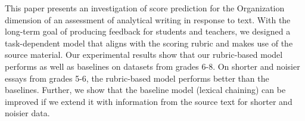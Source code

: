 This paper presents an investigation of score prediction for the Organization dimension of an assessment of analytical writing in response to text. With the long-term goal of producing feedback for students and teachers, we designed a task-dependent model that aligns with the scoring rubric and makes use of the source material. Our experimental results show that our rubric-based model performs as well as baselines on datasets from grades 6-8. On shorter and noisier essays from grades 5-6, the rubric-based model performs better than the baselines. Further, we show that the baseline model (lexical chaining) can be improved if we extend it with information from the source text for shorter and noisier data.
